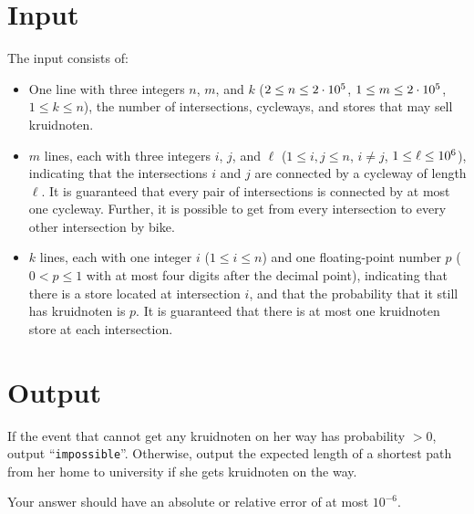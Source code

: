 \section*{Input}
    The input consists of:
    \begin{itemize}
    \item One line with three integers $n$, $m$, and $k$ ($2\leq n\leq 2 \cdot 10^5$, $1\leq m\leq 2 \cdot 10^5$, $1\leq k\leq n$), the number of
    intersections, cycleways, and stores that may sell kruidnoten.
    \item $m$ lines, each with three integers $i$, $j$, and $\ell$ ($1\leq i, j\leq n$, $i \neq j$, $1 \leq \ell \leq 10^6$), indicating that the intersections $i$ and $j$ are connected by a cycleway of length $\ell$.
    It is guaranteed that every pair of intersections is connected by at most one cycleway.
    Further, it is possible to get from every intersection to every other intersection by bike.
    \item $k$ lines, each with one integer $i$ ($1\leq i \leq n$) and one floating-point number $p$ ($0 < p \leq 1$ with at most four digits after the decimal point), indicating that there is a store located at intersection $i$, and that the probability that it still has kruidnoten is $p$.
    It is guaranteed that there is at most one kruidnoten store at each intersection.
    \end{itemize}

\section*{Output}

If the event that \name{} cannot get any kruidnoten on her way has probability $> 0$, output ``\texttt{impossible}''.
Otherwise, output the expected length of a shortest path from her home to university if she gets kruidnoten on the way.

Your answer should have an absolute or relative error of at most $10^{-6}$.
